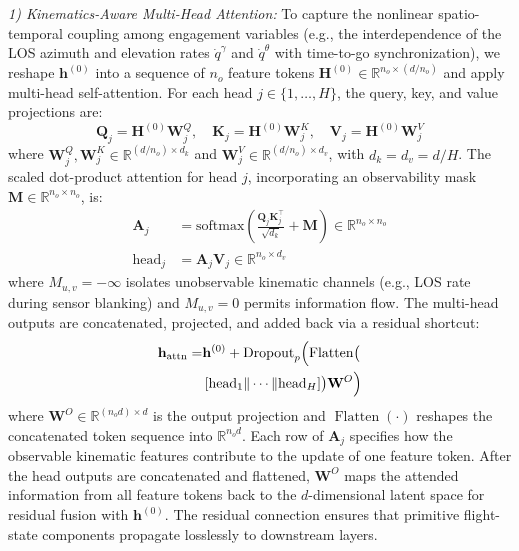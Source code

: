 \documentclass[lettersize,journal]{IEEEtran}
\begin{document}
\emph{1) Kinematics-Aware Multi-Head Attention:} To capture the nonlinear spatio-temporal coupling among engagement variables (e.g., the interdependence of the LOS azimuth and elevation rates $\dot{q}^{\gamma}$ and $\dot{q}^{\theta}$ with time-to-go synchronization), we reshape $\mathbf{h}^{(0)}$ into a sequence of $n_o$ feature tokens $\mathbf{H}^{(0)} \in \mathbb{R}^{n_o \times (d/n_o)}$ and apply multi-head self-attention. For each head $j \in \{1, \dots, H\}$, the query, key, and value projections are:
\begin{equation}
\label{eq:qkv}
\mathbf{Q}_j = \mathbf{H}^{(0)}\mathbf{W}_j^{Q}, \quad \mathbf{K}_j = \mathbf{H}^{(0)}\mathbf{W}_j^{K}, \quad \mathbf{V}_j = \mathbf{H}^{(0)}\mathbf{W}_j^{V}
\end{equation}
where $\mathbf{W}_j^{Q}, \mathbf{W}_j^{K} \in \mathbb{R}^{(d/n_o) \times d_k}$ and $\mathbf{W}_j^{V} \in \mathbb{R}^{(d/n_o) \times d_v}$, with $d_k = d_v = d/H$. The scaled dot-product attention for head $j$, incorporating an observability mask $\mathbf{M} \in \mathbb{R}^{n_o \times n_o}$, is:
\begin{align}
\mathbf{A}_j &= \mathrm{softmax}\!\left(\frac{\mathbf{Q}_j\mathbf{K}_j^\top}{\sqrt{d_k}} + \mathbf{M}\right) \in \mathbb{R}^{n_o \times n_o} \label{eq:attention} \\
\mathrm{head}_j &= \mathbf{A}_j\mathbf{V}_j \in \mathbb{R}^{n_o \times d_v} \nonumber
\end{align}
where $M_{u,v} = -\infty$ isolates unobservable kinematic channels (e.g., LOS rate during sensor blanking) and $M_{u,v} = 0$ permits information flow. The multi-head outputs are concatenated, projected, and added back via a residual shortcut:
\begin{equation}
\label{eq:mha_out}
\begin{split}
\mathbf{h}_{\mathrm{attn}} =& \mathbf{h}^{(0)} + \mathrm{Dropout}_{p}\Bigl(\operatorname{Flatten}\bigl( \\
&\left[\mathrm{head}_1 \| \cdots \| \mathrm{head}_H\right]\bigr) \mathbf{W}^{O}\Bigr)
\end{split}
\end{equation}
where $\mathbf{W}^{O} \in \mathbb{R}^{(n_o d) \times d}$  is the output projection and $\operatorname{Flatten}(\cdot)$ reshapes the concatenated token sequence into $\mathbb{R}^{n_o d}$.
Each row of $\mathbf{A}_j$ specifies how the observable
kinematic features contribute to the update of one feature token. After the
head outputs are concatenated and flattened, $\mathbf{W}^{O}$ maps the
attended information from all feature tokens back to the $d$-dimensional
latent space for residual fusion with $\mathbf{h}^{(0)}$.
The residual connection ensures that primitive flight-state components propagate losslessly to downstream layers.
\end{document}
